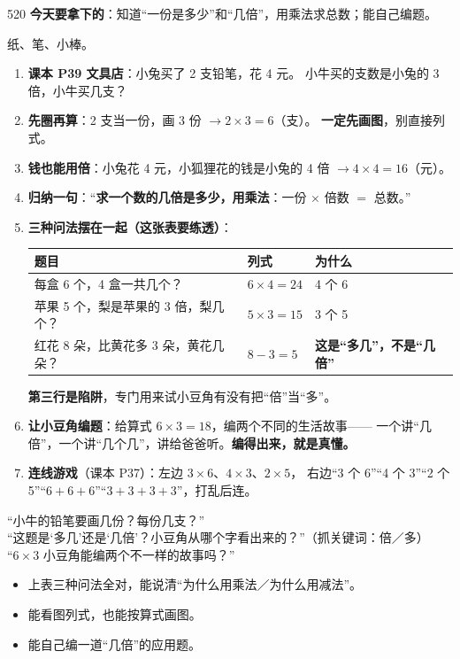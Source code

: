 \begin{lesson}{5}{20}
\textbf{今天要拿下的}：知道“一份是多少”和“几倍”，用乘法求总数；能自己编题。

\begin{materials}
纸、笔、小棒。
\end{materials}

\begin{enumerate}
  \item \textbf{课本 P39 文具店}：小兔买了 2 支铅笔，花 4 元。
        小牛买的支数是小兔的 3 倍，小牛买几支？
  \item \textbf{先圈再算}：2 支当一份，画 3 份 $\to 2\times3=6$（支）。
        \textbf{一定先画图}，别直接列式。
  \item \textbf{钱也能用倍}：小兔花 4 元，小狐狸花的钱是小兔的 4 倍
        $\to 4\times4=16$（元）。
  \item \textbf{归纳一句}：“\textbf{求一个数的几倍是多少，用乘法}：一份 $\times$ 倍数 $=$ 总数。”
  \item \textbf{三种问法摆在一起（这张表要练透）}：
        \begin{center}
        \small
        \begin{tabularx}{\linewidth}{@{}p{6.2cm}p{3.2cm}X@{}}
        \toprule
        \textbf{题目} & \textbf{列式} & \textbf{为什么} \\
        \midrule
        每盒 6 个，4 盒一共几个？ & $6\times4=24$ & 4 个 6 \\
        苹果 5 个，梨是苹果的 3 倍，梨几个？ & $5\times3=15$ & 3 个 5 \\
        红花 8 朵，比黄花多 3 朵，黄花几朵？ & $8-3=5$ &
        \textbf{这是“多几”，不是“几倍”} \\
        \bottomrule
        \end{tabularx}
        \end{center}
        \textbf{第三行是陷阱}，专门用来试小豆角有没有把“倍”当“多”。
  \item \textbf{让小豆角编题}：给算式 $6\times3=18$，编两个不同的生活故事——
        一个讲“几倍”，一个讲“几个几”，讲给爸爸听。\textbf{编得出来，就是真懂。}
  \item \textbf{连线游戏}（课本 P37）：左边 $3\times6$、$4\times3$、$2\times5$，
        右边“3 个 6”“4 个 3”“2 个 5”“$6+6+6$”“$3+3+3+3$”，打乱后连。
\end{enumerate}

\begin{saybox}
“小牛的铅笔要画几份？每份几支？”\\
“这题是‘多几’还是‘几倍’？小豆角从哪个字看出来的？”（抓关键词：倍／多）\\
“$6\times3$ 小豆角能编两个不一样的故事吗？”
\end{saybox}

\begin{passbox}
\begin{itemize}
  \item 上表三种问法全对，能说清“为什么用乘法／为什么用减法”。
  \item 能看图列式，也能按算式画图。
  \item 能自己编一道“几倍”的应用题。
\end{itemize}
\end{passbox}
\end{lesson}

